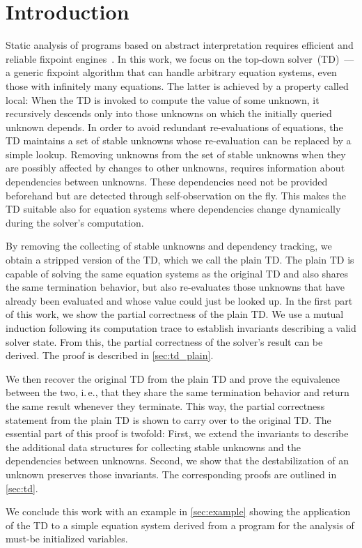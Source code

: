 \documentclass[11pt,a4paper]{article}
\newcommand{\td}{TD\xspace}
\newcommand{\ie}{i.\,e.\xspace}
\begin{document}
\section{Introduction}
Static analysis of programs based on abstract interpretation requires efficient and reliable fixpoint engines~\cite{cousotAbstractInterpretationUnified1977}.
In this work, we focus on the top-down solver~(\td)~\cite{tilscherTopDownSolverExercise2023}---a generic fixpoint algorithm that can handle arbitrary equation systems, even those with infinitely many equations.
The latter is achieved by a property called local: When the \td is invoked to compute the value of some unknown, it recursively descends only into those unknowns on which the initially queried unknown depends.
In order to avoid redundant re-evaluations of equations, the \td maintains a set of stable unknowns whose re-evaluation can be replaced by a simple lookup.
Removing unknowns from the set of stable unknowns when they are possibly affected by changes to other unknowns, requires information about dependencies between unknowns.
These dependencies need not be provided beforehand but are detected through self-observation on the fly.
This makes the \td suitable also for equation systems where dependencies change dynamically during the solver's computation.

By removing the collecting of stable unknowns and dependency tracking, we obtain a stripped version of the \td, which we call the plain \td.
The plain \td is capable of solving the same equation systems as the original \td and also shares the same termination behavior, but also re-evaluates those unknowns that have already been evaluated and whose value could just be looked up.
In the first part of this work, we show the partial correctness of the plain \td.
We use a mutual induction following its computation trace to establish invariants describing a valid solver state.
From this, the partial correctness of the solver's result can be derived.
The proof is described in \cref{sec:td_plain}.

We then recover the original \td from the plain \td and prove the equivalence between the two, \ie, that they share the same termination behavior and return the same result whenever they terminate.
This way, the partial correctness statement from the plain \td is shown to carry over to the original \td.
The essential part of this proof is twofold:
First, we extend the invariants to describe the additional data structures for collecting stable unknowns and the dependencies between unknowns.
Second, we show that the destabilization of an unknown preserves those invariants.
The corresponding proofs are outlined in \cref{sec:td}.

We conclude this work with an example in \cref{sec:example} showing the application of the \td to a simple equation system derived from a program for the analysis of must-be initialized variables.





\end{document}
